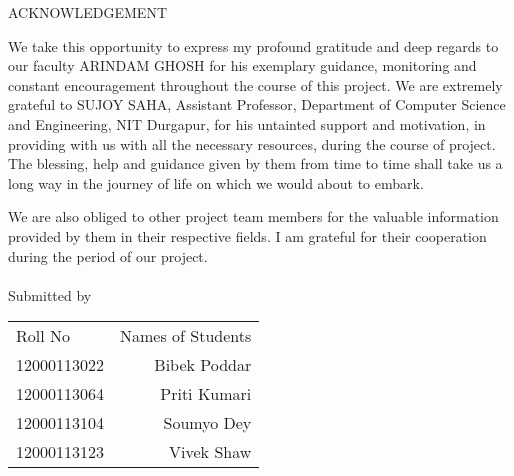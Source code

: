 \newpage
\begin{center}
\huge{\LARGE ACKNOWLEDGEMENT}\\[1cm]
\end{center}







We take this opportunity to express my profound gratitude and deep regards to our faculty  ARINDAM GHOSH for his exemplary guidance, monitoring and constant encouragement throughout the course of this project. We are extremely grateful to SUJOY SAHA, Assistant Professor, Department of Computer Science and Engineering, NIT Durgapur, for his untainted support and motivation, in providing with us with all the necessary resources, during the course of project. The blessing, help and guidance given by them from time to time shall take us a long way in the journey of life on which we would about to embark. 

We are also obliged to other project team members for the valuable information provided by them in their respective fields. I am grateful for their cooperation during the period of our project. \\
\\

\normalsize 
Submitted by \\
\begin{table}[h]
\begin{tabular}{lr}\\
Roll No & Names of Students 
\\
12000113022 & Bibek Poddar \\
12000113064 & Priti Kumari  \\
12000113104 & Soumyo Dey \\ 
12000113123 & Vivek Shaw \\ 
\end{tabular}
\end{table}


